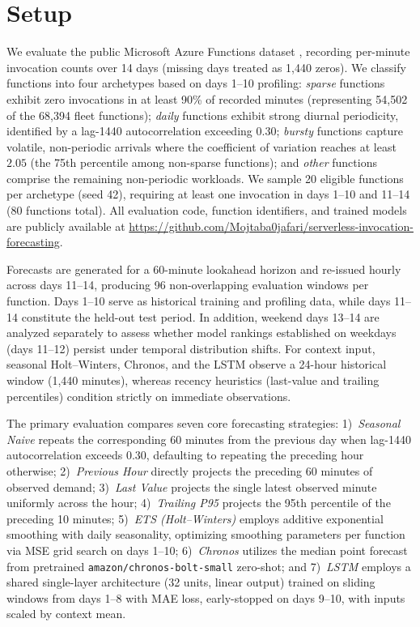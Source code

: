 \documentclass[conference,a4paper]{IEEEtran}
\begin{document}
\section{Setup}
\label{sec:setup}
We evaluate the public Microsoft Azure Functions dataset \cite{shahrad2020serverless}, recording per-minute invocation counts over 14 days (missing days treated as 1{,}440 zeros). We classify functions into four archetypes based on days 1--10 profiling:
\textit{sparse} functions exhibit zero invocations in at least 90\% of recorded minutes (representing 54{,}502 of the 68{,}394 fleet functions);
\textit{daily} functions exhibit strong diurnal periodicity, identified by a lag-1440 autocorrelation exceeding $0.30$;
\textit{bursty} functions capture volatile, non-periodic arrivals where the coefficient of variation reaches at least $2.05$ (the 75th percentile among non-sparse functions); and
\textit{other} functions comprise the remaining non-periodic workloads.
We sample 20 eligible functions per archetype (seed 42), requiring at least one invocation in days 1--10 and 11--14 (80 functions total). All evaluation code, function identifiers, and trained models are publicly available at \url{https://github.com/Mojtaba0jafari/serverless-invocation-forecasting}.

Forecasts are generated for a 60-minute lookahead horizon and re-issued hourly across days 11--14, producing 96 non-overlapping evaluation windows per function. Days 1--10 serve as historical training and profiling data, while days 11--14 constitute the held-out test period. In addition, weekend days 13--14 are analyzed separately to assess whether model rankings established on weekdays (days 11--12) persist under temporal distribution shifts. For context input, seasonal Holt--Winters, Chronos, and the LSTM observe a 24-hour historical window (1{,}440 minutes), whereas recency heuristics (last-value and trailing percentiles) condition strictly on immediate observations.

The primary evaluation compares seven core forecasting strategies:
1)~\textit{Seasonal Naive} repeats the corresponding 60 minutes from the previous day when lag-1440 autocorrelation exceeds 0.30, defaulting to repeating the preceding hour otherwise;
2)~\textit{Previous Hour} directly projects the preceding 60 minutes of observed demand;
3)~\textit{Last Value} projects the single latest observed minute uniformly across the hour;
4)~\textit{Trailing P95} projects the 95th percentile of the preceding 10 minutes;
5)~\textit{ETS (Holt--Winters)} employs additive exponential smoothing with daily seasonality, optimizing smoothing parameters per function via MSE grid search on days 1--10;
6)~\textit{Chronos} utilizes the median point forecast from pretrained \texttt{amazon/chronos-bolt-small} \cite{ansari2024chronos} zero-shot; and
7)~\textit{LSTM} employs a shared single-layer architecture (32 units, linear output) trained on sliding windows from days 1--8 with MAE loss, early-stopped on days 9--10, with inputs scaled by context mean.
\end{document}
